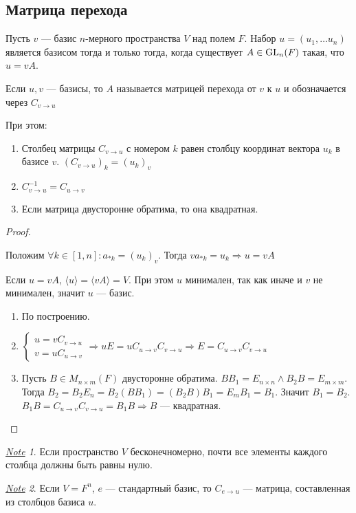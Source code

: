 \documentclass[11pt]{book}
\newcommand{\GL}{{\mathop{\text{\rm GL}}}}
\theoremstyle{definition}
\theoremstyle{plain}
\theoremstyle{plain}
\theoremstyle{definition}
\theoremstyle{remark}
\newtheorem*{note}{\underline{Note}}
\begin{document}
\subsection{Матрица перехода}
\begin{thm}
    Пусть $ v$ --- базис  $ n$-мерного пространства  $ V$ над полем  $ F$. Набор  $ u = (u_1, \ldots u_n)$ является базисом тогда и только тогда, когда существует $ A \in \GL _n (F)$ такая, что $ u = vA$.
    \begin{defn}
	Если  $ u, v$ --- базисы, то  $ A$ называется {\sf матрицей перехода}  от $ v$ к  $ u$ и обозначается через  $ C_{v \to  u}$
    \end{defn}
    При этом:
    \begin{enumerate}[noitemsep,label={\rm (\arabic*)}]
	\item Столбец матрицы $ C_{v \to u}$ с номером  $ k$ равен столбцу координат вектора $ u_k$ в базисе  $ v$.  $ (C_{v \to  u})_k = (u_k)_v$
	\item $ C^{-1}_{v \to  u} = C_{u \to  v}$
	\item Если матрица двусторонне обратима, то она квадратная.
    \end{enumerate}
\end{thm}
\begin{proof}
    $ $
    \begin{description}
	\item \boxed{  \Longrightarrow }  Положим $ \forall k \in [1, n]: a_{*k} = (u_k)_v$. Тогда $ va_{*k} = u_k \Longrightarrow u = vA$
	\item \boxed{  \Longrightarrow } Если $ u = vA$,  $ \langle u  \rangle = \langle vA \rangle = V$. При этом $ u$ минимален, так как иначе и  $ v$ не минимален, значит  $ u$ --- базис.
    \end{description}
    \begin{enumerate}[noitemsep]
	\item По построению.
	\item  $
	    \begin{cases}
		u = v C_{v \to  u}\\
		v = u C_{u \to  v}
	    \end{cases} \Longrightarrow uE = uC_{u \to  v} C_{v \to  u} \Longrightarrow E = C_{u \to  v} C_{v \to  u}
	    $
	\item Пусть  $ B \in M_{n \times m}(F)$ двусторонне обратима.  $ B B_1 = E_{n\times n} \wedge B_2 B = E_{m\times m}$. Тогда  $ B_2 = B_2 E_{n} = B_2(B B_1)=(B_2 B) B_1 = E_m B_1 = B_1$. Значит $ B_1 = B_2$. $ B_1B = C_{u \to  v}C_{v \to  u} = B_1B \Longrightarrow B \text{ --- квадратная}$.
    \end{enumerate}
\end{proof}
\begin{note}
    Если пространство $ V$ бесконечномерно,  почти все элементы каждого столбца должны быть равны нулю.
\end{note}
\begin{note}
    Если $ V = F^{n}$, $ e$ --- стандартный базис, то  $ C_{e \to  u}$ --- матрица, составленная из столбцов базиса $ u$.
\end{note}
\end{document}
